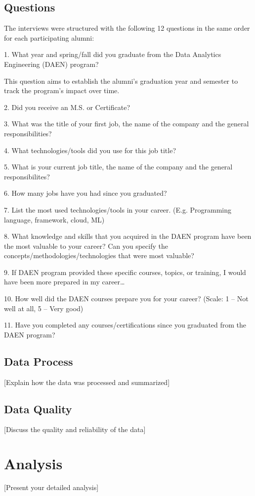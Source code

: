 \documentclass[12pt,a4paper]{article}
\begin{document}
\subsection{Questions}
The interviews were structured with the following 12 questions in the same order for each participating alumni:

1. What year and spring/fall did you graduate from the Data Analytics Engineering (DAEN) program? 

This question aims to establish the alumni's graduation year and semester to track the program's impact over time.

2. Did you receive an M.S. or Certificate?  

3. What was the title of your first job, the name of the company and the general responsibilities?

4. What technologies/tools did you use for this job title? 

5. What is your current job title, the name of the company and the general responsibilites?  

6. How many jobs have you had since you graduated? 

7. List the most used technologies/tools in your career. (E.g. Programming language, framework, cloud, ML) 

8. What knowledge and skills that you acquired in the DAEN program have been the most valuable to your career? Can you specify the concepts/methodologies/technologies that were most valuable? 

9. If DAEN program provided these specific courses, topics, or training, I would have been more prepared in my career… 

10. How well did the DAEN courses prepare you for your career? (Scale: 1 – Not well at all, 5 – Very good) 

11. Have you completed any courses/certifications since you graduated from the DAEN program? 

\subsection{Data Process}
[Explain how the data was processed and summarized]

\subsection{Data Quality}
[Discuss the quality and reliability of the data]

\section{Analysis}
[Present your detailed analysis]
\end{document}
